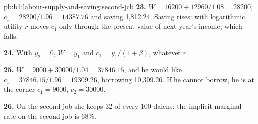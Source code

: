 \begin{solution}{pb:b1:labour-supply-and-saving:second-job}
\textbf{23.} $W = 16200 + 12960/1.08 = 28200$, $c_1 = 28200/1.96 = 14387.76$ and saving
1,812.24. Saving rises: with logarithmic utility $r$ moves $c_1$ only through the
present value of next year's income, which falls.

\textbf{24.} With $y_2 = 0$, $W = y_1$ and $c_1 = y_1/(1 + \beta)$, whatever $r$.

\textbf{25.} $W = 9000 + 30000/1.04 = 37846.15$, and he would like
$c_1 = 37846.15/1.96 = 19309.26$, borrowing 10,309.26. If he cannot borrow, he is at
the corner $c_1 = 9000$, $c_2 = 30000$.

\textbf{26.} On the second job she keeps 32 of every 100 dalens: the implicit
marginal rate on the second job is $68\%$.
\end{solution}
